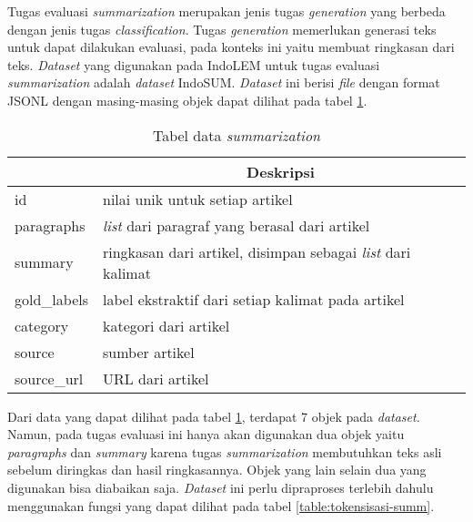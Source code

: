 Tugas evaluasi \textit{summarization} merupakan jenis tugas \textit{generation} yang berbeda dengan jenis tugas \textit{classification}. Tugas \textit{generation} memerlukan generasi teks untuk dapat dilakukan evaluasi, pada konteks ini yaitu membuat ringkasan dari teks. \textit{Dataset} yang digunakan pada IndoLEM untuk tugas evaluasi \textit{summarization} adalah \textit{dataset} IndoSUM. \textit{Dataset} ini berisi \textit{file} dengan format JSONL dengan masing-masing objek dapat dilihat pada tabel \ref{table:data-summarization}.

\begin{table}[h]
    \vspace{0.25cm}
    \caption{Tabel data \textit{summarization}}
    \label{table:data-summarization}
    \begin{center}
        \begin{tabular}{|l|l|}
            \hline \rowcolor{black!10}
            \multicolumn{1}{|c|}{\textbf{Objek}} & \multicolumn{1}{|c|}{\textbf{Deskripsi}} \\ \hline
            id & nilai unik untuk setiap artikel \\ \hline
            paragraphs & \textit{list} dari paragraf yang berasal dari artikel \\ \hline
            summary & ringkasan dari artikel, disimpan sebagai \textit{list} dari kalimat \\ \hline 
            gold\_labels & label ekstraktif dari setiap kalimat pada artikel \\ \hline
            category & kategori dari artikel \\ \hline
            source & sumber artikel \\ \hline
            source\_url & URL dari artikel \\ \hline
        \end{tabular}
    \end{center}
\end{table}

Dari data yang dapat dilihat pada tabel \ref{table:data-summarization}, terdapat 7 objek  pada \textit{dataset}. Namun, pada tugas evaluasi ini hanya akan digunakan dua objek yaitu \textit{paragraphs} dan \textit{summary} karena tugas \textit{summarization} membutuhkan teks asli sebelum diringkas dan hasil ringkasannya. Objek yang lain selain dua yang digunakan bisa diabaikan saja. \textit{Dataset} ini perlu dipraproses terlebih dahulu menggunakan fungsi yang dapat dilihat pada tabel \ref{table:tokensisasi-summ}.

